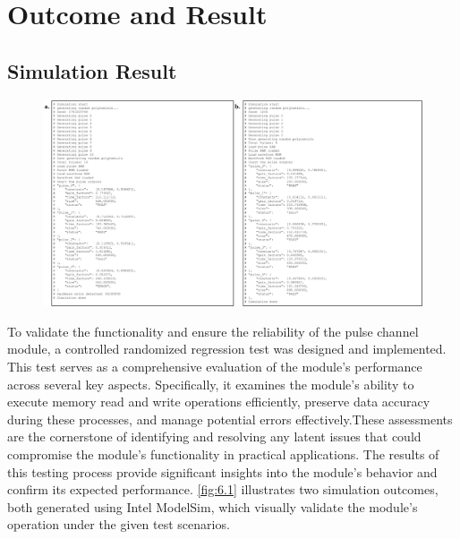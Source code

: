 \chapter{Outcome and Result}

\section{Simulation Result}
\begin{figure}[ht]
    \centering
    \includegraphics[width=1\linewidth]{figures/6.1.png}
    \caption{}
    \label{fig:6.1}
\end{figure}
To validate the functionality and ensure the reliability of the pulse channel module, a controlled randomized regression test was designed and implemented. This test serves as a comprehensive evaluation of the module's performance across several key aspects. Specifically, it examines the module's ability to execute memory read and write operations efficiently, preserve data accuracy during these processes, and manage potential errors effectively.These assessments are the cornerstone of identifying and resolving any latent issues that could compromise the module's functionality in practical applications. The results of this testing process provide significant insights into the module's behavior and confirm its expected performance. \autoref{fig:6.1} illustrates two simulation outcomes, both generated using Intel ModelSim, which visually validate the module's operation under the given test scenarios.


